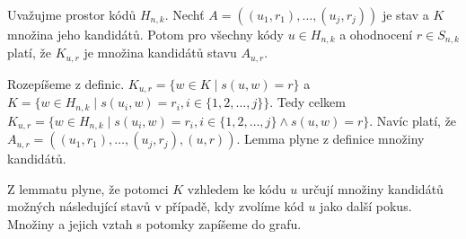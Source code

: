 
\begin{lemma}\label{lemmavztahnaslednikuapotomku}
    Uvažujme prostor kódů $H_{n,k}$. Nechť $A = \left((u_1, r_1), \dots, (u_j,r_j)\right)$ je stav a $K$ množina jeho kandidátů. Potom pro všechny kódy $u\in H_{n,k}$ a ohodnocení $r \in S_{n,k}$ platí, že $K_{u,r}$ je množina kandidátů stavu $A_{u,r}$.
\end{lemma}
\begin{dukaz}
    Rozepíšeme z definic. 
    $K_{u,r} = \{w \in K \mid s(u,w) = r\}$ a $K = \{w \in H_{n,k} \mid s(u_i,w) = r_i,  i \in \{1,2,\dots ,j\} \}$. Tedy celkem 
    $K_{u,r} = \{w \in H_{n,k} \mid s(u_i,w) = r_i,  i \in \{1,2,\dots ,j\} \land s(u,w) = r\}$.
    Navíc platí, že $A_{u,r} = \left((u_1, r_1), \dots, (u_j,r_j), (u,r)\right)$. Lemma plyne z definice množiny kandidátů.
\end{dukaz}
Z lemmatu plyne, že potomci $K$ vzhledem ke kódu $u$ určují množiny kandidátů možných následující stavů v případě, kdy zvolíme kód $u$ jako další pokus. Množiny a jejich vztah s potomky zapíšeme do grafu. 

